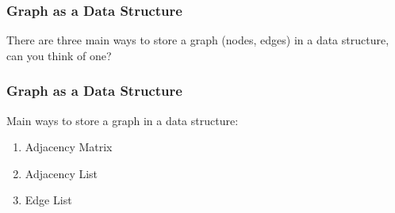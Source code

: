 \documentclass{beamer}
\begin{document}
\begin{frame}
\frametitle{Graph as a Data Structure}
		There are three main ways to store a graph (nodes, edges) in a data structure, \color{blue} \huge{can you think of one?} \color{black}
\end{frame}

\begin{frame}
\frametitle{Graph as a Data Structure}
	Main ways to store a graph in a data structure:
	\begin{enumerate}
	    \item Adjacency Matrix
	    \item Adjacency List
	    \item Edge List
	\end{enumerate}
\end{frame}
\end{document}
